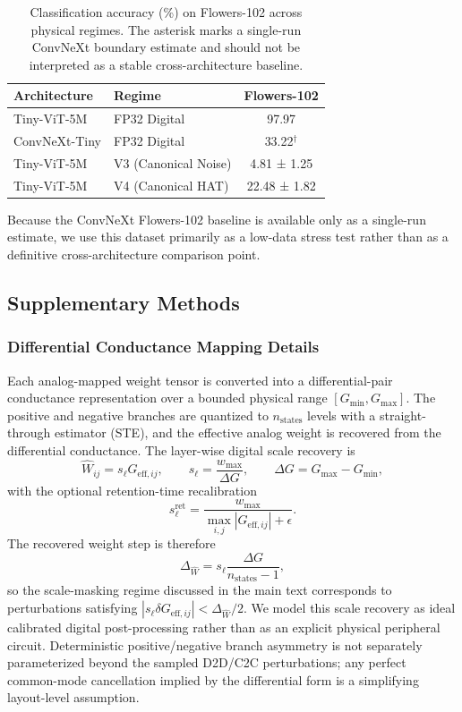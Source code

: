 \FloatBarrier

\begin{table}[ht]
\centering
\caption{Classification accuracy (\%) on Flowers-102 across physical regimes. The asterisk marks a single-run ConvNeXt boundary estimate and should not be interpreted as a stable cross-architecture baseline.}
\label{tab:supp-flowers-results}
\begin{tabular}{llc}
\toprule
\textbf{Architecture} & \textbf{Regime} & \textbf{Flowers-102} \\
\midrule
Tiny-ViT-5M & FP32 Digital & 97.97 \\
ConvNeXt-Tiny & FP32 Digital & 33.22$^{\dagger}$ \\
Tiny-ViT-5M & V3 (Canonical Noise) & 4.81 ± 1.25 \\
Tiny-ViT-5M & V4 (Canonical HAT) & 22.48 ± 1.82 \\
\bottomrule
\end{tabular}
\end{table}

Because the ConvNeXt Flowers-102 baseline is available only as a single-run estimate, we use this dataset primarily as a low-data stress test rather than as a definitive cross-architecture comparison point.

\FloatBarrier

\subsection{Supplementary Methods}
\label{subsec:supp-methods}

\subsubsection{Differential Conductance Mapping Details}

Each analog-mapped weight tensor is converted into a differential-pair conductance representation over a bounded physical range $[G_{\min}, G_{\max}]$. The positive and negative branches are quantized to $n_{\mathrm{states}}$ levels with a straight-through estimator (STE), and the effective analog weight is recovered from the differential conductance. The layer-wise digital scale recovery is
\[
\hat{W}_{ij}=s_{\ell}G_{\mathrm{eff},ij},
\qquad
s_{\ell}=\frac{w_{\max}}{\Delta G},
\qquad
\Delta G = G_{\max}-G_{\min},
\]
with the optional retention-time recalibration
\[
s_{\ell}^{\mathrm{ret}}=\frac{w_{\max}}{\max_{i,j}|G_{\mathrm{eff},ij}|+\epsilon}.
\]
The recovered weight step is therefore
\[
\Delta_{\hat{W}} = s_{\ell}\frac{\Delta G}{n_{\mathrm{states}}-1},
\]
so the scale-masking regime discussed in the main text corresponds to perturbations satisfying $|s_{\ell}\delta G_{\mathrm{eff},ij}| < \Delta_{\hat{W}}/2$. We model this scale recovery as ideal calibrated digital post-processing rather than as an explicit physical peripheral circuit. Deterministic positive/negative branch asymmetry is not separately parameterized beyond the sampled D2D/C2C perturbations; any perfect common-mode cancellation implied by the differential form is a simplifying layout-level assumption.

